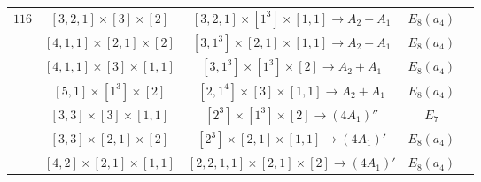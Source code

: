 \documentclass[reqno,12pt]{amsart}
\numberwithin{equation}{section}
\theoremstyle{plain}
\theoremstyle{definition}
\begin{document}
\begin{table}[htbp]
\begin{tabular}{|c|c|c|c|c|}
$116$ &     $ [3,2,1]\times [3]\times [2] $  &$[3,2,1]\times [1^3]\times [1,1]\rightarrow      A_2+A_1 $  &   $E_8(a_4) $  \\
&  $ [4,1,1]\times [2,1]\times [2] $  &$[3,1^3]\times [2,1]\times [1,1]\rightarrow      A_2+A_1 $  &   $E_8(a_4) $  \\
&  $ [4,1,1]\times [3]\times [1,1] $  &$[3,1^3]\times [1^3]\times [2]\rightarrow      A_2+A_1 $  &   $E_8(a_4) $  \\
&  $ [5,1]\times [1^3]\times [2] $  &$[2,1^4]\times [3]\times [1,1]\rightarrow      A_2 +A_1$  &   $E_8(a_4) $  \\
&  $ [3,3]\times [3]\times [1,1] $  &$[2^3]\times [1^3]\times [2]\rightarrow      (4A_1)'' $  &   $E_7 $  \\
&  $ [3,3]\times [2,1]\times [2] $  &$[2^3]\times [2,1]\times [1,1]\rightarrow      (4A_1)' $ &   $E_8(a_4) $  \\
&  $ [4,2]\times [2,1]\times [1,1] $  &$[2,2,1,1]\times [2,1]\times [2]\rightarrow      (4A_1)' $  &   $E_8(a_4) $  \\
\hline
\end{tabular}
	\bigskip
	
\end{table}
\newpage 
\end{document}
